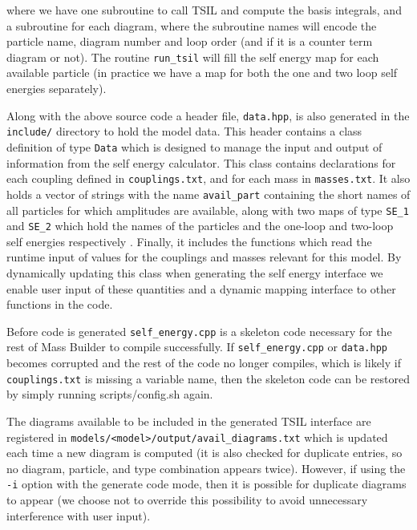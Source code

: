 where we have one subroutine to call TSIL and compute the basis integrals, and a subroutine for each diagram, where the subroutine names will encode the particle name, diagram number and loop order (and if it is a counter term diagram or not).  The routine \lstinline{run_tsil} will fill the self energy map for each available particle (in practice we have a map for both the one and two loop self energies separately).

Along with the above source code a header file, \lstinline{data.hpp}, is also generated in the \lstinline{include/} directory to hold the model data.  This header contains a class definition of type \lstinline{Data} which is designed to manage the input and output of information from the self energy calculator.   This class contains declarations for each coupling defined in \lstinline{couplings.txt}, and for each mass in \lstinline{masses.txt}.  It also holds a vector of strings with the name \lstinline{avail_part} containing the short names of all particles for which amplitudes are available, along with two maps of type  \lstinline{SE_1} and \lstinline{SE_2} which hold the names of the particles and the one-loop and two-loop self energies respectively .  Finally, it includes the functions which read the runtime input of values for the couplings and masses relevant for this model.  By dynamically updating this class when generating the self energy interface we enable user input of these quantities and a dynamic mapping interface to other functions in the code.

Before code is generated \lstinline{self_energy.cpp} is a skeleton code necessary for the rest of Mass Builder to compile successfully.  If \lstinline{self_energy.cpp} or \lstinline{data.hpp} becomes corrupted and the rest of the code no longer compiles, which is likely if \lstinline{couplings.txt} is missing a variable name, then the skeleton code can be restored by simply running scripts/config.sh again.

The diagrams available to be included in the generated TSIL interface are registered in \lstinline{models/<model>/output/avail_diagrams.txt} which is updated each time a new diagram is computed (it is also checked for duplicate entries, so no diagram, particle, and type combination appears twice).  However, if using the \lstinline{-i} option with the generate code mode, then it is possible for duplicate diagrams to appear (we choose not to override this possibility to avoid unnecessary interference with user input).






